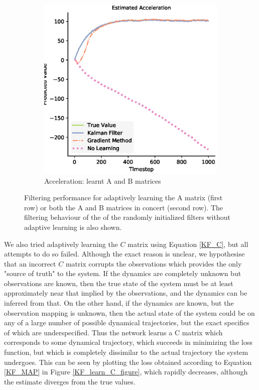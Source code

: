 \begin{figure}[H]
\begin{subfigure}{0.33\textwidth}
    \centering
    \includegraphics[width=.8\linewidth]{chapter_3_figures/Estimated_Acceleration_AB_matrix.eps}
    \caption{Acceleration: learnt A and B matrices}
  \end{subfigure}
  \caption{Filtering performance for adaptively learning the A matrix (first row) or both the A and B matrices in concert (second row). The filtering behaviour of the of the randomly initialized filters without adaptive learning is also shown.}
\end{figure}

We also tried adaptively learning the $C$ matrix using Equation \ref{KF_C}, but all attempts to do so failed. Although the exact reason is unclear, we hypothesise that an incorrect $C$ matrix corrupts the observations which provides the only "source of truth" to the system. If the dynamics are completely unknown but observations are known, then the true state of the system must be at least approximately near that implied by the observations, and the dynamics can be inferred from that. On the other hand, if the dynamics are known, but the observation mapping is unknown, then the actual state of the system could be on any of a large number of possible dynamical trajectories, but the exact specifics of which are underspecified. Thus the network learns a C matrix which corresponds to some dynamical trajectory, which succeeds in minimizing the loss function, but which is completely dissimilar to the actual trajectory the system undergoes. This can be seen by plotting the loss obtained according to Equation \ref{KF_MAP} in Figure \ref{KF_learn_C_figure}, which rapidly decreases, although the estimate diverges from the true values.

